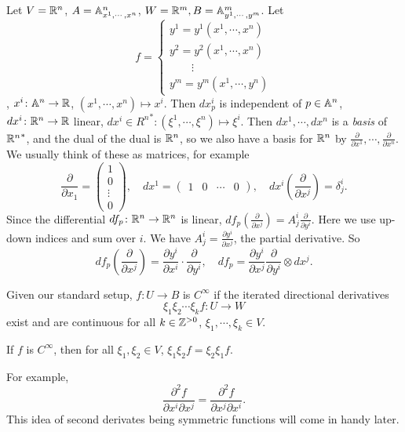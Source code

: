 \begin{example}
    Let $V=\mathbb{R}^n $, $A=\mathbb{A}^n _{x^1,\cdots ,x^n } $, $W=\mathbb{R}^m, B=\mathbb{A}^m _{y^1,\cdots ,y^m}$. Let \[
    f = 
    \begin{cases}
        y^1=y^1(x^1,\cdots ,x^n )\\
        y^2 = y^2(x^1,\cdots ,x^n )\\
      \qquad  \vdots \\
        y^m=y^m(x^1,\cdots ,y^n )
    \end{cases}
\] , $x^i  \colon \mathbb{A}^n  \to \mathbb{R}$, $(x^1,\cdots ,x^n ) \mapsto  x^i $. Then $d x^i _p$ is independent of $p \in \mathbb{A}^n $, $dx ^i  \colon \mathbb{R}^n  \to \mathbb{R}$ linear, $dx^i  \in {R^n}^* \colon (\xi ^1,\cdots ,\xi ^n )\mapsto \xi ^i $. Then $dx^1,\cdots ,dx^n $ is a \emph{basis} of ${\mathbb{R}^n }^* $, and the dual of the dual is $\mathbb{R}^n $, so we also have a basis for $\mathbb{R}^n $ by $\frac{\partial }{\partial x^1},\cdots ,\frac{\partial }{\partial x^n }$. We usually think of these as matrices, for example \[
\frac{\partial }{\partial x_1}=
\begin{pmatrix}
    1 \\ 0 \\ \vdots \\ 0
\end{pmatrix}, \quad dx^1= 
\begin{pmatrix}
    1 & 0 & \cdots  & 0
\end{pmatrix}, \quad dx^i  \left( \frac{\partial }{\partial x^j } \right) = \delta ^i _j .
\] Since the differential $df_p \colon \mathbb{R}^n  \to \mathbb{R}^n $ is linear, $df_p\left( \frac{\partial }{\partial x^j }\right)=A_j ^i  \frac{\partial }{\partial y^i }$. Here we use up-down indices and sum over $i$. We have $A^i _j = \frac{\partial y^i }{\partial x^j }$, the partial derivative. So \[
df_p\left( \frac{\partial }{\partial x^j } \right) = \frac{\partial y^i }{\partial x^i }\cdot \frac{\partial }{\partial y^i }, \quad df_p= \frac{\partial y^i }{\partial x^j }\frac{\partial }{\partial y^i }\otimes dx^j .
\] 
\end{example}
\begin{definition}[]
    Given our standard setup, $f \colon U \to B$ is $C^{\infty}$ if the iterated directional derivatives \[
    \xi_1\xi_2\cdots \xi_k f \colon U \to W
    \] exist and are continuous for all $k \in \mathbb{Z}^{>0}$, $\xi_1,\cdots ,\xi_k \in V$.
\end{definition}
\begin{example}
    If $f$ is $C^{\infty}$, then for all $\xi_1,\xi_2 \in V$, $\xi_1\xi_2 f = \xi_2\xi_1 f$.
\end{example}
\begin{example}
    For example, \[
    \frac{\partial ^2 f}{\partial x^i \partial x^j }= \frac{\partial ^2 f}{\partial x^j  \partial x^i }.
    \] This idea of second derivates being symmetric functions will come in handy later.
\end{example}

